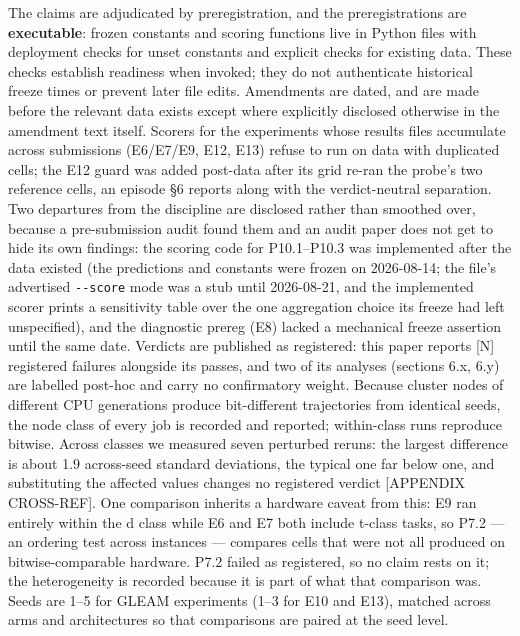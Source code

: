 The claims are adjudicated by preregistration, and the preregistrations
are \textbf{executable}: frozen constants and scoring functions live in
Python files with deployment checks for unset constants and explicit checks
for existing data. These checks establish readiness when invoked; they do
not authenticate historical freeze times or prevent later file edits. Amendments are dated, and are made before the relevant data
exists except where explicitly disclosed otherwise in the amendment text
itself. Scorers for the experiments whose results files accumulate
across submissions (E6/E7/E9, E12, E13) refuse to run on data with
duplicated cells; the E12 guard was added post-data after its grid
re-ran the probe's two reference cells, an episode \S6 reports along with
the verdict-neutral separation. Two departures from the discipline are
disclosed rather than smoothed over, because a pre-submission audit
found them and an audit paper does not get to hide its own findings: the
scoring code for P10.1--P10.3 was implemented after the data existed
(the predictions and constants were frozen on 2026-08-14; the file's
advertised \texttt{-\/-score} mode was a stub until 2026-08-21, and the
implemented scorer prints a sensitivity table over the one aggregation
choice its freeze had left unspecified), and the diagnostic prereg (E8)
lacked a mechanical freeze assertion until the same date. Verdicts are
published as registered: this paper reports {[}N{]} registered failures
alongside its passes, and two of its analyses (sections 6.x, 6.y) are
labelled post-hoc and carry no confirmatory weight. Because cluster
nodes of different CPU generations produce bit-different trajectories
from identical seeds, the node class of every job is recorded and
reported; within-class runs reproduce bitwise. Across classes we
measured seven perturbed reruns: the largest difference is about 1.9
across-seed standard deviations, the typical one far below one, and
substituting the affected values changes no registered verdict
{[}APPENDIX CROSS-REF{]}. One comparison inherits a hardware caveat from
this: E9 ran entirely within the d class while E6 and E7 both include
t-class tasks, so P7.2 --- an ordering test across instances ---
compares cells that were not all produced on bitwise-comparable
hardware. P7.2 failed as registered, so no claim rests on it; the
heterogeneity is recorded because it is part of what that comparison
was. Seeds are 1--5 for GLEAM experiments (1--3 for E10 and E13),
matched across arms and architectures so that comparisons are paired at
the seed level.


